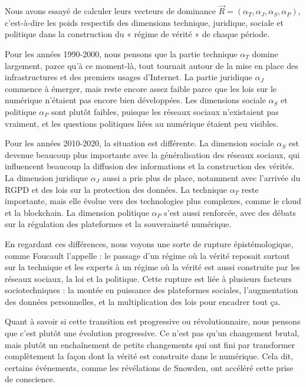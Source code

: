 \documentclass[12pt,a4paper]{report}
\begin{document}
Nous avons essayé de calculer leurs vecteurs de dominance \(\vec{R} = (\alpha_T, \alpha_J, \alpha_S, \alpha_P)\), c’est-à-dire les poids respectifs des dimensions technique, juridique, sociale et politique dans la construction du « régime de vérité » de chaque période.

Pour les années 1990-2000, nous pensons que la partie technique \(\alpha_T\) domine largement, parce qu’à ce moment-là, tout tournait autour de la mise en place des infrastructures et des premiers usages d’Internet. La partie juridique \(\alpha_J\) commence à émerger, mais reste encore assez faible parce que les lois sur le numérique n’étaient pas encore bien développées. Les dimensions sociale \(\alpha_S\) et politique \(\alpha_P\) sont plutôt faibles, puisque les réseaux sociaux n’existaient pas vraiment, et les questions politiques liées au numérique étaient peu visibles.

Pour les années 2010-2020, la situation est différente. La dimension sociale \(\alpha_S\) est devenue beaucoup plus importante avec la généralisation des réseaux sociaux, qui influencent beaucoup la diffusion des informations et la construction des vérités. La dimension juridique \(\alpha_J\) aussi a pris plus de place, notamment avec l’arrivée du RGPD et des lois sur la protection des données. La technique \(\alpha_T\) reste importante, mais elle évolue vers des technologies plus complexes, comme le cloud et la blockchain. La dimension politique \(\alpha_P\) s’est aussi renforcée, avec des débats sur la régulation des plateformes et la souveraineté numérique.

En regardant ces différences, nous voyons une sorte de rupture épistémologique, comme Foucault l’appelle : le passage d’un régime où la vérité reposait surtout sur la technique et les experts à un régime où la vérité est aussi construite par les réseaux sociaux, la loi et la politique. Cette rupture est liée à plusieurs facteurs sociotechniques : la montée en puissance des plateformes sociales, l’augmentation des données personnelles, et la multiplication des lois pour encadrer tout ça.

Quant à savoir si cette transition est progressive ou révolutionnaire, nous pensons que c’est plutôt une évolution progressive. Ce n’est pas qu’un changement brutal, mais plutôt un enchaînement de petits changements qui ont fini par transformer complètement la façon dont la vérité est construite dans le numérique. Cela dit, certains événements, comme les révélations de Snowden, ont accéléré cette prise de conscience.
\end{document}
